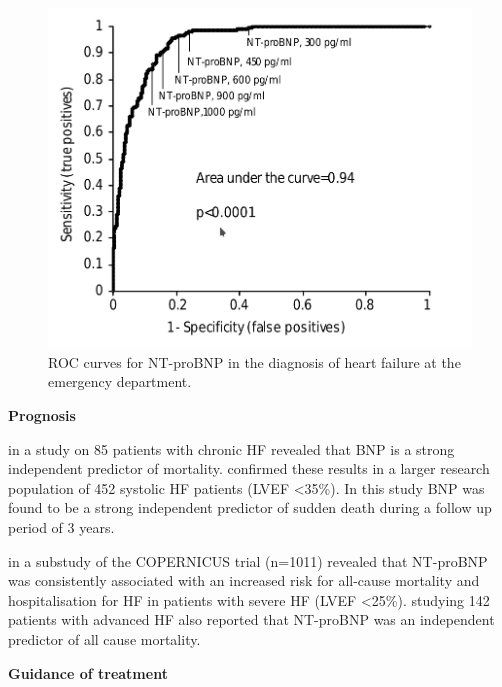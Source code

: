 \documentclass[14pt,a4paper,onecolumn]{extarticle}
\begin{document}
\begin{figure}
    \centering
    \includegraphics[scale=0.4]{../../images/NTBNP_ER.png}
    \small\caption{ROC curves for NT-proBNP in the diagnosis of heart failure at the emergency department.\citep{Januzzi2005}}
    \label{NTBNP_ER}
\end{figure}





\textbf{Prognosis}



\citep{Tsutamoto1997} in a study on 85 patients with chronic HF revealed that BNP is a strong independent predictor of mortality.  \citep{Berger2002} confirmed these results in a larger research population of 452 systolic HF patients (LVEF <35\%). In this study BNP was found to be a strong independent predictor of sudden death during a follow up period of 3 years.



\citep{Hartmann2004} in a substudy of the COPERNICUS trial (n=1011) revealed that NT-proBNP was consistently associated with an increased risk for all-cause mortality and hospitalisation for HF in patients with severe HF (LVEF <25\%). \citep{Gardner2003b} studying 142 patients with advanced HF also reported that NT-proBNP was an independent predictor of all cause mortality.





\textbf{Guidance of treatment}
\end{document}
